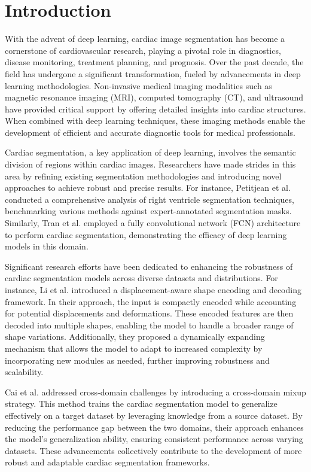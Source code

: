 \documentclass[preprint,12pt]{elsarticle}
\begin{document}
\section{Introduction}
\label{intro}
With the advent of deep learning, cardiac image segmentation has become a cornerstone of cardiovascular research, playing a pivotal role in diagnostics, disease monitoring, treatment planning, and prognosis. Over the past decade, the field has undergone a significant transformation, fueled by advancements in deep learning methodologies. Non-invasive medical imaging modalities such as magnetic resonance imaging (MRI), computed tomography (CT), and ultrasound have provided critical support by offering detailed insights into cardiac structures. When combined with deep learning techniques, these imaging methods enable the development of efficient and accurate diagnostic tools for medical professionals.

Cardiac segmentation, a key application of deep learning, involves the semantic division of regions within cardiac images. Researchers have made strides in this area by refining existing segmentation methodologies and introducing novel approaches to achieve robust and precise results. For instance, Petitjean et al. \cite{RV_segmentation} conducted a comprehensive analysis of right ventricle segmentation techniques, benchmarking various methods against expert-annotated segmentation masks. Similarly, Tran et al. \cite{cardiac_fcn} employed a fully convolutional network (FCN) architecture \cite{fcn} to perform cardiac segmentation, demonstrating the efficacy of deep learning models in this domain.


Significant research efforts have been dedicated to enhancing the robustness of cardiac segmentation models across diverse datasets and distributions. For instance, Li et al. \cite{displacement_aware} introduced a displacement-aware shape encoding and decoding framework. In their approach, the input is compactly encoded while accounting for potential displacements and deformations. These encoded features are then decoded into multiple shapes, enabling the model to handle a broader range of shape variations. Additionally, they proposed a dynamically expanding mechanism that allows the model to adapt to increased complexity by incorporating new modules as needed, further improving robustness and scalability.

Cai et al. \cite{cross_domain} addressed cross-domain challenges by introducing a cross-domain mixup strategy. This method trains the cardiac segmentation model to generalize effectively on a target dataset by leveraging knowledge from a source dataset. By reducing the performance gap between the two domains, their approach enhances the model's generalization ability, ensuring consistent performance across varying datasets. These advancements collectively contribute to the development of more robust and adaptable cardiac segmentation frameworks.
\end{document}
